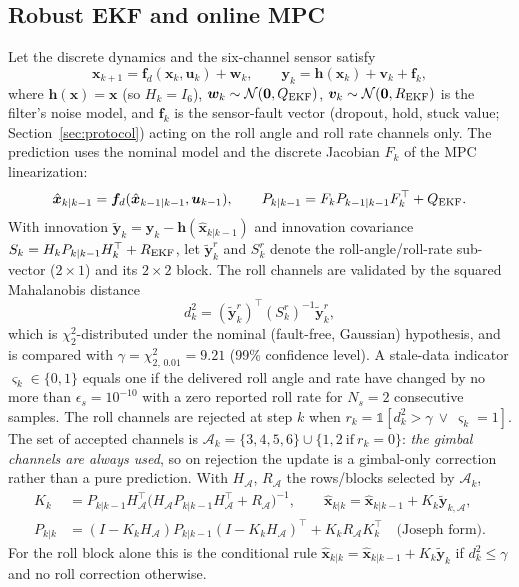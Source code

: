 \documentclass[preprint,12pt,authoryear=false]{elsarticle}
\theoremstyle{remark}\newtheorem{remark}{Remark}
\theoremstyle{plain}\newtheorem{proposition}{Proposition}\newtheorem{lemma}{Lemma}
\theoremstyle{definition}\newtheorem{assumption}{Assumption}
\begin{document}
\subsection{Robust EKF and online MPC}\label{sec:ekf}
Let the discrete dynamics and the six-channel sensor satisfy
\begin{equation}
\bm x_{k+1}=\bm f_d(\bm x_k,\bm u_k)+\bm w_k,\qquad \bm y_k=\bm h(\bm x_k)+\bm v_k+\bm f_k,\label{eq:meas}
\end{equation}
where $\bm h(\bm x)=\bm x$ (so $H_k=I_6$), $\bm w_k\sim\mathcal N(\bm 0,Q_{\rm EKF})$, $\bm v_k\sim\mathcal N(\bm 0,R_{\rm EKF})$ is the filter's noise model, and $\bm f_k$ is the sensor-fault vector (dropout, hold, stuck value; Section~\ref{sec:protocol}) acting on the roll angle and roll rate channels only. The prediction uses the nominal model and the discrete Jacobian $F_k$ of the MPC linearization:
\begin{equation}
\hat{\bm x}_{k|k-1}=\bm f_d(\hat{\bm x}_{k-1|k-1},\bm u_{k-1}),\qquad P_{k|k-1}=F_kP_{k-1|k-1}F_k^\top+Q_{\rm EKF}.
\end{equation}
With innovation $\tilde{\bm y}_k=\bm y_k-\bm h(\hat{\bm x}_{k|k-1})$ and innovation covariance $S_k=H_kP_{k|k-1}H_k^\top+R_{\rm EKF}$, let $\tilde{\bm y}_k^{r}$ and $S_k^{r}$ denote the roll-angle/roll-rate sub-vector ($2\times1$) and its $2\times2$ block. The roll channels are validated by the squared Mahalanobis distance
\begin{equation}
d_k^2=(\tilde{\bm y}_k^{r})^\top (S_k^{r})^{-1}\tilde{\bm y}_k^{r},\label{eq:maha}
\end{equation}
which is $\chi^2_2$-distributed under the nominal (fault-free, Gaussian) hypothesis, and is compared with $\gamma=\chi^2_{2,\,0.01}=9.21$ (99\% confidence level). A stale-data indicator $\varsigma_k\in\{0,1\}$ equals one if the delivered roll angle and rate have changed by no more than $\epsilon_s=10^{-10}$ with a zero reported roll rate for $N_s=2$ consecutive samples. The roll channels are rejected at step $k$ when $r_k=\mathbb 1[d_k^2>\gamma\ \lor\ \varsigma_k=1]$. The set of accepted channels is $\mathcal A_k=\{3,4,5,6\}\cup\{1,2\ \text{if}\ r_k=0\}$: \emph{the gimbal channels are always used}, so on rejection the update is a gimbal-only correction rather than a pure prediction. With $H_{\mathcal A}$, $R_{\mathcal A}$ the rows/blocks selected by $\mathcal A_k$,
\begin{align}
K_k&=P_{k|k-1}H_{\mathcal A}^\top\big(H_{\mathcal A}P_{k|k-1}H_{\mathcal A}^\top+R_{\mathcal A}\big)^{-1},\qquad
\hat{\bm x}_{k|k}=\hat{\bm x}_{k|k-1}+K_k\tilde{\bm y}_{k,\mathcal A},\label{eq:upd}\\
P_{k|k}&=(I-K_kH_{\mathcal A})P_{k|k-1}(I-K_kH_{\mathcal A})^\top+K_kR_{\mathcal A}K_k^\top\quad\text{(Joseph form).}\label{eq:joseph}
\end{align}
For the roll block alone this is the conditional rule $\hat{\bm x}_{k|k}=\hat{\bm x}_{k|k-1}+K_k\tilde{\bm y}_k$ if $d_k^2\le\gamma$ and no roll correction otherwise.
\end{document}
